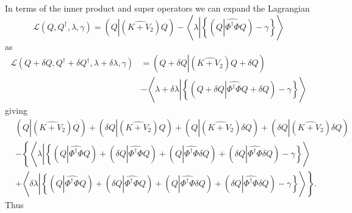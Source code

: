 \documentclass[aps,preprint]{revtex4}%
\begin{document}
In terms of the inner product and super operators we can expand the
Lagrangian
\begin{equation}
\mathcal{L}\left(  Q,Q^{\dagger},\lambda,\gamma\right)  =\left(  Q\left\vert
\left(  \widehat{K+V_{2}}\right)  Q\right.  \right)  -\left\langle
\lambda\left\vert \left\{  \left(  Q\left\vert \widehat{\Phi^{\dagger}\Phi
}Q\right.  \right)  -\gamma\right\}  \right.  \right\rangle
\end{equation}
as
\begin{align}
\mathcal{L}\left(  Q+\delta Q,Q^{\dagger}+\delta Q^{\dagger},\lambda
+\delta\lambda,\gamma\right)   &  =\left(  Q+\delta Q\left\vert \left(
\widehat{K+V_{2}}\right)  Q+\delta Q\right.  \right)  \nonumber\\
&  -\left\langle \lambda+\delta\lambda\left\vert \left\{  \left(  Q+\delta
Q\left\vert \widehat{\Phi^{\dagger}\Phi}Q+\delta Q\right.  \right)
-\gamma\right\}  \right.  \right\rangle
\end{align}
giving
\begin{align}
&  \left(  Q\left\vert \left(  \widehat{K+V_{2}}\right)  Q\right.  \right)
+\left(  \delta Q\left\vert \left(  \widehat{K+V_{2}}\right)  Q\right.
\right)  +\left(  Q\left\vert \left(  \widehat{K+V_{2}}\right)  \delta
Q\right.  \right)  +\left(  \delta Q\left\vert \left(  \widehat{K+V_{2}%
}\right)  \delta Q\right.  \right)  \nonumber\\
&  -\left\{  \left\langle \lambda\left\vert \left\{  \left(  Q\left\vert
\widehat{\Phi^{\dagger}\Phi}Q\right.  \right)  +\left(  \delta Q\left\vert
\widehat{\Phi^{\dagger}\Phi}Q\right.  \right)  +\left(  Q\left\vert
\widehat{\Phi^{\dagger}\Phi}\delta Q\right.  \right)  +\left(  \delta
Q\left\vert \widehat{\Phi^{\dagger}\Phi}\delta Q\right.  \right)
-\gamma\right\}  \right.  \right\rangle \right.  \nonumber\\
&  \left.  +\left\langle \delta\lambda\left\vert \left\{  \left(  Q\left\vert
\widehat{\Phi^{\dagger}\Phi}Q\right.  \right)  +\left(  \delta Q\left\vert
\widehat{\Phi^{\dagger}\Phi}Q\right.  \right)  +\left(  Q\left\vert
\widehat{\Phi^{\dagger}\Phi}\delta Q\right.  \right)  +\left(  \delta
Q\left\vert \widehat{\Phi^{\dagger}\Phi}\delta Q\right.  \right)
-\gamma\right\}  \right.  \right\rangle \right\}  .
\end{align}
Thus
\end{document}
